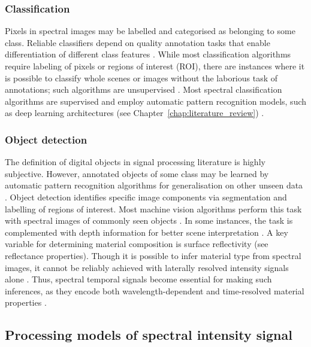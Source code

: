 \documentclass[12pt,a4paper,oneside]{report}
\begin{document}
\subsubsection{Classification}
\label{subsubsec:spectral_classification}

Pixels in spectral images may be labelled and categorised as belonging to some class. Reliable classifiers depend on quality annotation tasks that enable differentiation of different class features \cite{bishop2006}. While most classification algorithms require labeling of pixels or regions of interest (ROI), there are instances where it is possible to classify whole scenes or images without the laborious task of annotations; such algorithms are unsupervised \cite{bishop2006}. Most spectral classification algorithms are supervised and employ automatic pattern recognition models, such as deep learning architectures (see Chapter~\ref{chap:literature_review}) \cite{lecun1998}.

\subsubsection{Object detection}
\label{subsubsec:spectral_object_detection}

The definition of digital objects in signal processing literature is highly subjective. However, annotated objects of some class may be learned by automatic pattern recognition algorithms for generalisation on other unseen data \cite{redmon2015,redmon2018}. Object detection identifies specific image components via segmentation and labelling of regions of interest. Most machine vision algorithms perform this task with spectral images of commonly seen objects \cite{redmon2018}. In some instances, the task is complemented with depth information for better scene interpretation \cite{moramartin2021,yang2023,yang2024}. A key variable for determining material composition is surface reflectivity (see reflectance properties). Though it is possible to infer material type from spectral images, it cannot be reliably achieved with laterally resolved intensity signals alone \cite{su2016,becker2023}. Thus, spectral temporal signals become essential for making such inferences, as they encode both wavelength-dependent and time-resolved material properties \cite{inagaki2020,su2016,becker2023}.

\subsection{Processing models of spectral intensity signal}
\label{subsubsec:processing_models_spectral_intensity_detailed}
\end{document}
